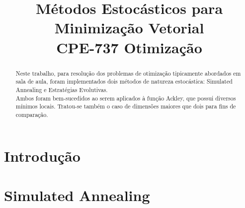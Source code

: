 \documentclass[conference,compsoc]{IEEEtran}
\begin{document}
\title{Métodos Estocásticos para Minimização Vetorial\\ CPE-737 Otimização}


\author{
\and
{}
\and
{}
}


\maketitle

\begin{abstract}
Neste trabalho, para resolução dos problemas de otimização tipicamente abordados em sala de aula, foram implementados dois métodos de natureza estocástica: Simulated Annealing e Estratégias Evolutivas. \\
\newline
Ambos foram bem-sucedidos ao serem aplicados à função Ackley, que possui diversos mínimos locais. Tratou-se também o caso de dimensões maiores que dois para fins de comparação.\\
\end{abstract}





%
\IEEEpeerreviewmaketitle


\section{Introdução} %


\section{Simulated Annealing}
\end{document}
